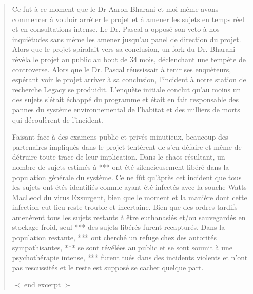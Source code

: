 \begin{quotation}
Ce fut à ce moment que le Dr Aaron Bharani et moi-même avons commencer à vouloir arréter le projet et à amener les sujets en temps réel et en consultations intense. Le Dr. Pascal a opposé son veto à nos inquiétudes sans même les amener jusqu'au panel de direction du projet. Alors que le projet spiralait vers sa conclusion, un fork du Dr. Bharani révéla le projet au public au bout de 34 mois, déclenchant une tempête de controverse. Alors que le Dr. Pascal réussissait à tenir ses enquèteurs, espérant voir le projet arriver à sa conclusion, l'incident à notre station de recherche Legacy se produidit. L'enquète initiale conclut qu'au moins un des sujets s'était échappé du programme et était en fait responsable des pannes du système environnemental de l'habitat et des milliers de morts qui découlèrent de l'incident. 

Faisant face à des examens public et privés minutieux, beaucoup des partenaires impliqués dans le projet tentèrent de s'en défaire  et même de détruire toute trace de leur implication. Dans le chaos résultant, un nombre de sujets estimés à *** ont été silencieusement libéré dans la population générale du système. Ce ne fût qu'àprès cet incident que tous les sujets ont étés identifiés comme ayant été infectés avec la souche Watts-MacLeod du virus Exsurgent, bien que le moment et la manière dont cette infection eut lieu reste trouble et incertaine. Bien que des ordres tardifs amenèrent tous les sujets restants à être euthanasiés et/ou sauvegardés en stockage froid, seul *** des sujets libérés furent recapturés. Dans la population restante, *** ont cherché un refuge chez des autorités sympathisantes, *** se sont révélées au public et se sont soumit à une psychothérapie intense, *** furent tués dans des incidents violents et n'ont pas rescussités et le reste est supposé se cacher quelque part. 

$\prec$ end excerpt $\succ$ \end{quotation} 
